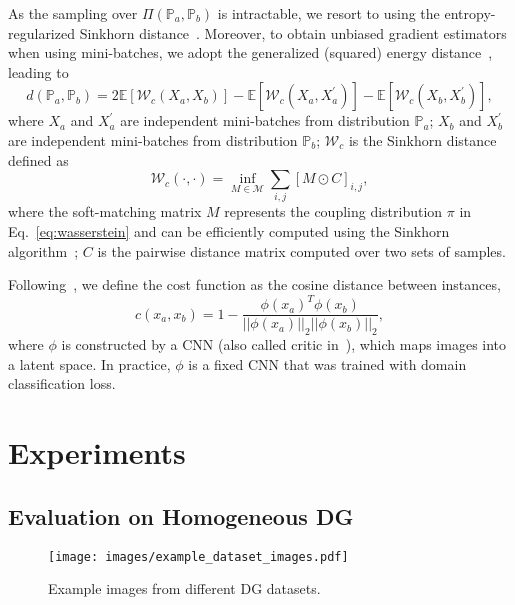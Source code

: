 \documentclass[runningheads]{llncs}
\begin{document}
As the sampling over $\Pi(\mathbb{P}_a, \mathbb{P}_b)$ is intractable, we resort to using the entropy-regularized Sinkhorn distance~\cite{cuturi2013sinkhorn}. Moreover, to obtain unbiased gradient estimators when using mini-batches, we adopt the generalized (squared) energy distance~\cite{salimans2018improving}, leading to
\begin{equation} \label{eq:energy_dist}
d(\mathbb{P}_a, \mathbb{P}_b) = 2\mathbb{E}[\mathcal{W}_c(X_a, X_b)] - \mathbb{E}[\mathcal{W}_c(X_a, X_a^\prime)] - \mathbb{E}[\mathcal{W}_c(X_b, X_b^\prime)],
\end{equation}
where $X_a$ and $X_a^\prime$ are independent mini-batches from distribution $\mathbb{P}_a$; $X_b$ and $X_b^\prime$ are independent mini-batches from distribution $\mathbb{P}_b$; $\mathcal{W}_c$ is the Sinkhorn distance defined as
\begin{equation} \label{eq:sinkhorn}
\mathcal{W}_c(\cdot, \cdot) = \inf_{M \in \mathcal{M}} \sum_{i,j} [M \odot C]_{i,j},
\end{equation}
where the soft-matching matrix $M$ represents the coupling distribution $\pi$ in Eq.~\eqref{eq:wasserstein} and can be efficiently computed using the Sinkhorn algorithm~\cite{SinkhornAutoDiff}; $C$ is the pairwise distance matrix computed over two sets of samples.

Following~\cite{salimans2018improving}, we define the cost function as the cosine distance between instances,
\begin{equation} \label{eq:transport_cost}
c(x_a, x_b) = 1 - \frac{\phi(x_a)^T\phi(x_b)}{||\phi(x_a)||_2 ||\phi(x_b)||_2},
\end{equation}
where $\phi$ is constructed by a CNN (also called critic in~\cite{salimans2018improving}), which maps images into a latent space. In practice, $\phi$ is a fixed CNN that was trained with domain classification loss.

\section{Experiments} \label{sec:experiments}

\subsection{Evaluation on Homogeneous DG}

\begin{figure}[t]
    \centering
    \texttt{[image: images/example\_dataset\_images.pdf]}
    \caption{Example images from different DG datasets.}
    \label{fig:example_dataset_images}
\end{figure}
\end{document}
